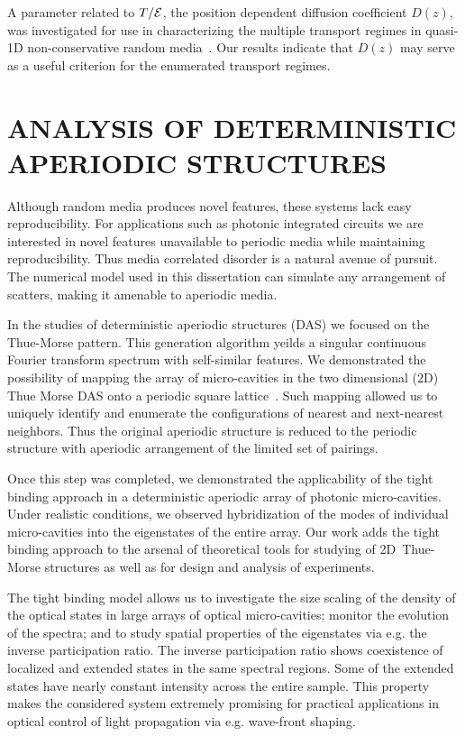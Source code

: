 A parameter related to $T/{\cal E}$, the position dependent diffusion coefficient $D(z)$, was investigated for use in characterizing the multiple transport regimes in quasi-1D non-conservative random media~\cite{2010_Payne_PRL}. Our results indicate that $D(z)$ may serve as a useful criterion for the enumerated transport regimes. 

\section{ANALYSIS OF DETERMINISTIC APERIODIC STRUCTURES}



Although random media produces novel features, these systems lack easy reproducibility. For applications such as photonic integrated circuits we are interested in novel features unavailable to periodic media while maintaining reproducibility. Thus media correlated disorder is a natural avenue of pursuit. The numerical model used in this dissertation can simulate any arrangement of scatters, making it amenable to aperiodic media. %

In the studies of deterministic aperiodic structures (DAS) we focused on the Thue-Morse pattern. This generation algorithm yeilds a singular continuous Fourier transform spectrum with self-similar features. We demonstrated the possibility of mapping the array of micro-cavities in the two dimensional (2D) Thue Morse DAS onto a periodic square lattice~\cite{2012_Payne_Mapping_2D_TM}. Such mapping allowed us to uniquely identify and enumerate the configurations of nearest and next-nearest neighbors. Thus the original aperiodic structure is reduced to the periodic structure with aperiodic arrangement of the limited set of pairings. 

Once this step was completed, we demonstrated the applicability of the tight binding approach in a deterministic aperiodic array of photonic micro-cavities. Under realistic conditions, we observed hybridization of the modes of individual micro-cavities into the eigenstates of the entire array. Our work adds the tight binding approach to the arsenal of theoretical tools for studying of 2D~Thue-Morse structures as well as for design and analysis of experiments.

The tight binding model allows us to investigate the size scaling of the density of the optical states in large arrays of optical micro-cavities; monitor the evolution of the spectra; and to study spatial properties of the eigenstates via e.g. the inverse participation ratio. The inverse participation ratio shows coexistence of localized and extended states in the same spectral regions. Some of the extended states have nearly constant intensity across the entire sample. This property makes the considered system extremely promising for practical applications in optical control of light propagation via e.g. wave-front shaping.
 


